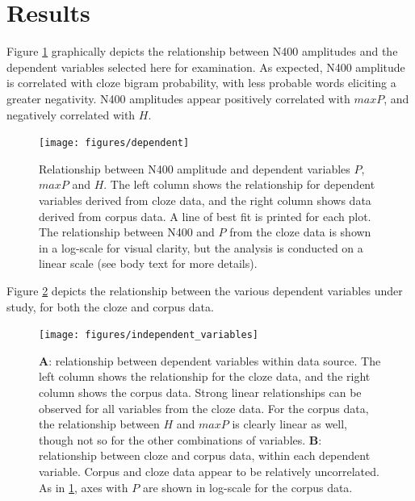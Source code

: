 \documentclass{article}
\begin{document}
\section{Results}

Figure \ref{fig_dependent} graphically depicts the relationship between N400 amplitudes and the dependent variables selected here for examination. As expected, N400 amplitude is correlated with cloze bigram probability, with less probable words eliciting a greater negativity. N400 amplitudes appear positively correlated with $maxP$, and negatively correlated with $H$.

\begin{figure}
\begin{centering}
\texttt{[image: figures/dependent]}
\caption{Relationship between N400 amplitude and dependent variables $P$, $maxP$ and $H$. The left column shows the relationship for dependent variables derived from cloze data, and the right column shows data derived from corpus data. A line of best fit is printed for each plot. The relationship between N400 and $P$ from the cloze data is shown in a log-scale for visual clarity, but the analysis is conducted on a linear scale (see body text for more details). \label{fig_dependent}}
\end{centering}
\end{figure}

Figure \ref{fig_independent} depicts the relationship between the various dependent variables under study, for both the cloze and corpus data.

\begin{figure}
	\centering
		\texttt{[image: figures/independent\_variables]}
	\caption{\textbf{A}: relationship between dependent variables within data source. The left column shows the relationship for the cloze data, and the right column shows the corpus data. Strong linear relationships can be observed for all variables from the cloze data. For the corpus data, the relationship between $H$ and $maxP$ is clearly linear as well, though not so for the other combinations of variables. \textbf{B}: relationship between cloze and corpus data, within each dependent variable.  Corpus and cloze data appear to be relatively uncorrelated. As in \ref{fig_dependent}, axes with $P$ are shown in log-scale for the corpus data. 
    \label{fig_independent}}
\end{figure}
\end{document}
